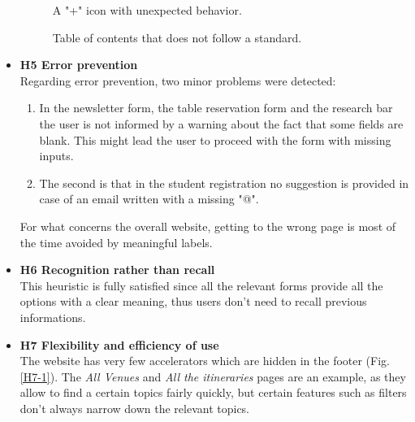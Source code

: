 \begin{itemize}
\begin{figure}[!ht]
\begin{minipage}{\linewidth}
                \captionsetup{justification=centering}
                \caption{A "+" icon with unexpected behavior.}
                \label{H4-2}
            \end{minipage}
        \end{figure}
        \begin{figure}[!ht]
            \begin{minipage}{\linewidth}
                \centering
                \captionsetup{justification=centering}
                \caption{Table of contents that does not follow a standard.}
                \label{H4-3}
            \end{minipage}
        \end{figure}
    \item \textbf{H5 Error prevention}\\
        Regarding error prevention, two minor problems were detected:
        \begin{enumerate}
            \item In the newsletter form, the table reservation form and the research bar the user is not informed by a warning about the fact that some fields are blank. This might lead the user to proceed with the form with missing inputs.
            \item The second is that in the student registration no suggestion is provided in case of an email written with a missing "@".
        \end{enumerate}  
        For what concerns the overall website, getting to the wrong page is most of the time avoided by meaningful labels.
    \item \textbf{H6 Recognition rather than recall}\\
        This heuristic is fully satisfied since all the relevant forms provide all the options with a clear meaning, thus users don't need to recall previous informations.
    \pagebreak
    \item \textbf{H7 Flexibility and efficiency of use}\\
        The website has very few accelerators which are hidden in the footer (Fig. \ref{H7-1}). The  \emph{All Venues} and \emph{All the itineraries} pages are an example, as they allow to find a certain topics fairly quickly, but certain features such as filters don't always narrow down the relevant topics.

\end{itemize}
